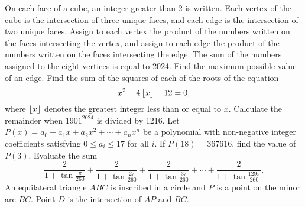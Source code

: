 \begin{enumerate}
    \begin{center}
    \end{center}
    \hyperrefitem[Q::2024-S-1-18] On each face of a cube, an integer greater than 2 is written. Each vertex of the cube is the intersection of three unique faces, and each edge is the intersection of two unique faces. Assign to each vertex the product of the numbers written on the faces intersecting the vertex, and assign to each edge the product of the numbers written on the faces intersecting the edge. The sum of the numbers assigned to the eight vertices is equal to 2024. Find the maximum possible value of an edge.
    \hyperrefitem[Q::2024-S-1-19] Find the sum of the squares of each of the roots of the equation \[x^2 - 4\left\lfloor x \right\rfloor - 12 = 0,\] where $\left\lfloor x \right\rfloor$ denotes the greatest integer less than or equal to $x$.
    \hyperrefitem[Q::2024-S-1-20] Calculate the remainder when $1901^{2024}$ is divided by 1216.
    \hyperrefitem[Q::2024-S-1-21] Let $P(x) = a_0 + a_1 x + a_2 x^2 + \cdots + a_n x^n$ be a polynomial with non-negative integer coefficients satisfying $0 \leq a_i \leq 17$ for all $i$. If $P(18) = 367616$, find the value of $P(3)$.
    \hyperrefitem[Q::2024-S-1-22] Evaluate the sum \[\frac{2}{1 + \tan{\frac{\pi}{260}}} + \frac{2}{1 + \tan{\frac{2\pi}{260}}} + \frac{2}{1 + \tan{\frac{3\pi}{260}}} + \cdots + \frac{2}{1 + \tan{\frac{129\pi}{260}}}.\]
    \hyperrefitem[Q::2024-S-1-23] An equilateral triangle $ABC$ is inscribed in a circle and $P$ is a point on the minor arc $BC$. Point $D$ is the intersection of $AP$ and $BC$.

    \begin{center}
\end{center}
\end{enumerate}
